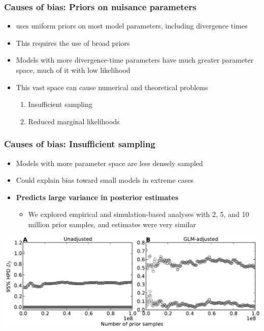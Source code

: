 \begin{frame}
    \frametitle{Causes of bias: Priors on nuisance parameters}
    \begin{itemize}
        \item \msb uses uniform priors on most model parameters, including
            divergence times
        \item This requires the use of broad priors
        \item Models with more divergence-time parameters have much greater
            parameter space, much of it with low likelihood
        \item This vast space can cause numerical and theoretical problems
        \begin{enumerate}
            \item Insufficient sampling
            \item Reduced marginal likelihoods
        \end{enumerate}
    \end{itemize}
\end{frame}

\begin{frame}
    \frametitle{Causes of bias: Insufficient sampling}
    \begin{itemize}
        \item Models with more parameter space are less densely sampled
        \item Could explain bias toward small models in extreme cases
        \item {\bf Predicts large variance in posterior estimates}
        \begin{itemize}
            \item We explored empirical and simulation-based analyses with
                2, 5, and 10 million prior samples, and estimates were
                very similar
        \end{itemize}
    \end{itemize}
    \smallskip
    \centerline{
    \includegraphics[width=\textwidth]{images/omega_over_sampling.pdf}}
\end{frame}

